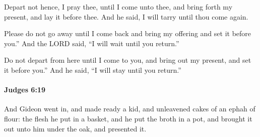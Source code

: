 			\begin{versebox}
					\item[BHS] 
					\item[ASV] Depart not hence, I pray thee, until I come unto thee, and bring forth my present, and lay it before thee. And he said, I will tarry until thou come again.
					\item[NIV] Please do not go away until I come back and bring my offering and set it before you.” And the LORD said, “I will wait until you return.”
					\item[NRSV] Do not depart from here until I come to you, and bring out my present, and set it before you.” And he said, “I will stay until you return.”
			\end{versebox}

		\paragraph{Judges 6:19} %
			\label{JUDGES-6-19}

			And Gideon went in, and made ready a kid, and unleavened cakes of an ephah of flour: the flesh he put in a basket, and he put the broth in a pot, and brought it out unto him under the oak, and presented it.

